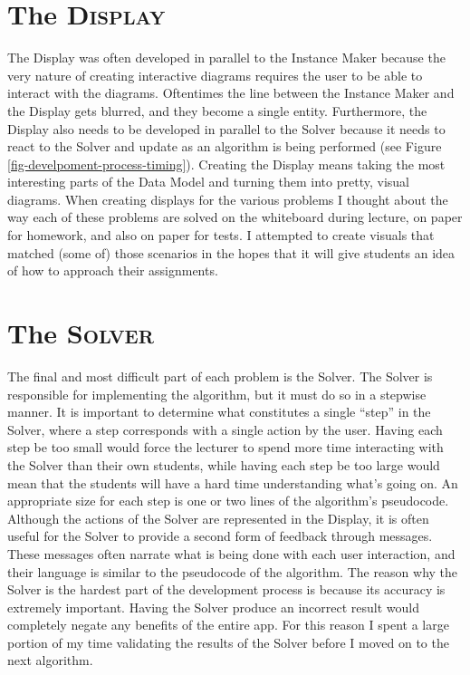 \section{The \textsc{Display}}
\hspace{-0.26in}
The Display was often developed in parallel to the Instance Maker because 
the very nature of creating interactive diagrams requires the user 
to be able to interact with the diagrams. 
Oftentimes the line between the Instance Maker and the Display gets blurred, 
and they become a single entity. 
Furthermore, the Display also needs to be developed in parallel to the 
Solver because it needs to react to the Solver and 
update as an algorithm is being performed (see Figure \ref{fig-develpoment-process-timing}). 
\newline\newline
Creating the Display means taking the most interesting parts of the Data Model and 
turning them into pretty, visual diagrams. 
When creating displays for the various problems I thought about the way
each of these problems are solved on the whiteboard during lecture, 
on paper for homework, and also on paper for tests.
I attempted to create visuals that matched (some of) those scenarios 
in the hopes that it will give students an idea of how to approach their assignments. 
%
\section{The \textsc{Solver}}
\hspace{-0.26in}
The final and most difficult part of each problem is the Solver. 
The Solver is responsible for implementing the algorithm,
but it must do so in a stepwise manner. 
It is important to determine what constitutes a single ``step'' in the Solver, 
where a step corresponds with a single action by the user. 
Having each step be too small would force the lecturer to spend more time 
interacting with the Solver than their own students, while having each step be 
too large would mean that the students will have a hard time 
understanding what's going on. 
An appropriate size for each step is one or two lines of the algorithm's pseudocode.
\newline\newline
Although the actions of the Solver are represented in the Display, it is often 
useful for the Solver to provide a second form of feedback through messages. 
These messages often narrate what is being done with each user interaction, 
and their language is similar to the pseudocode of the algorithm. 
\newline\newline
The reason why the Solver is the hardest part of the development process is because
its accuracy is extremely important. 
Having the Solver produce an incorrect result would completely negate 
any benefits of the entire app.
For this reason I spent a large portion of my time validating the results
of the Solver before I moved on to the next algorithm. 

